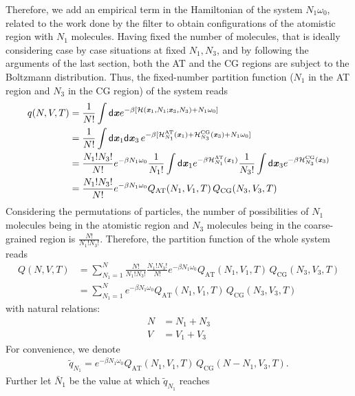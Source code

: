 \documentclass[aps,a4paper,reprint,onecolumn]{revtex4}
\newcommand{\vect}[1]{\textbf{\textit{#1}}}
\newcommand{\dd}[1]{\textsf{#1}}
\newcommand{\AT}{{\textrm{{AT}}}}
\newcommand{\CG}{{\textrm{CG}}}
\begin{document}
Therefore, we add an empirical term in the Hamiltonian of the system
$N_1\omega_0$, related to the work done  by the filter to obtain configurations of the atomistic region with $N_{1}$ molecules. 
Having fixed the number of molecules, that is ideally considering case by case situations at fixed $N_{1},N_{3}$, and by following the
arguments of the last section, both the AT and the CG regions are
subject to the Boltzmann distribution.
Thus, the fixed-number partition function ($N_1$ in the AT region and $N_3$ in the CG region) of the system reads
\begin{align}\nonumber
  q(N,V,T)
  &= \frac1{N!}\int
  \dd d\vect x
  e^{-\beta
    [\mathcal H(\vect x_1, N_1; \vect x_3, N_3) +
    N_1\omega_0]}\\\nonumber
  &= \frac1{N!}\int
  \dd d\vect x_1\dd d\vect x_3\,
  e^{-\beta
    [\mathcal H_{N_1}^{\AT}(\vect x_1) +
    \mathcal H_{N_3}^{\CG}(\vect x_3) +
    N_1\omega_0]}\\\nonumber
  & = \frac{N_1!N_3!}{N!}
  e^{-\beta N_1\omega_0}
  \frac{1}{N_1!}\int\dd d\vect x_1 e^{-\beta\mathcal H_{N_1}^{\AT}(\vect x_1)}
  \frac{1}{N_3!}\int\dd d\vect x_3 e^{-\beta\mathcal H_{N_3}^{\CG}(\vect x_3)}\\
  & = \frac{N_1!N_3!}{N!}
  e^{-\beta N_1\omega_0}
  Q_{\AT}(N_1, V_1, T)\,
  Q_{\CG}(N_3, V_3, T) 
\end{align}
Considering the permutations of particles, the number of possibilities of
$N_1$ molecules being in the atomistic region and $N_3$ molecules being
in the coarse-grained region is  $\frac{N!}{N_1!N_3!}$.
Therefore, the partition function of the whole system reads
\begin{align}\nonumber
  Q(N,V,T) &= \sum_{N_1=1}^N
  \frac{N!}{N_1!N_3!} \frac{N_1!N_3!}{N!}
  e^{-\beta N_1\omega_0}
  Q_{\AT}(N_1, V_1, T)\,
  Q_{\CG}(N_3, V_3, T) \\
  &= \sum_{N_1=1}^N
  e^{-\beta N_1\omega_0}
  Q_{\AT}(N_1, V_1, T)\,
  Q_{\CG}(N_3, V_3, T) 
\end{align}
with natural relations:
\begin{align}
  N &= N_1 + N_3\\
  V &= V_1 + V_3
\end{align}
For convenience, we denote
\begin{align}
  \tilde q_{N_1} = 
  e^{-\beta N_1\omega_0}
  Q_{\AT}(N_1, V_1, T)\,
  Q_{\CG}(N - N_1, V_3, T).
\end{align}
Further let $\bar N_1$ be the value at which $\tilde q_{N_1}$ reaches
\end{document}
